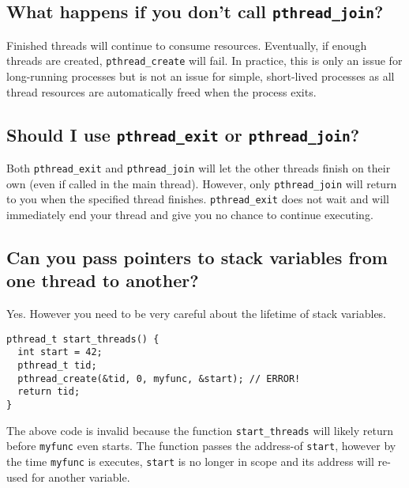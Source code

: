 \subsection{\texorpdfstring{What happens if you don't call
\texttt{pthread\_join}?}{What happens if you don't call pthread\_join?}}\label{what-happens-if-you-dont-call-pthreadux5fjoin}

Finished threads will continue to consume resources. Eventually, if
enough threads are created, \texttt{pthread\_create} will fail. In
practice, this is only an issue for long-running processes but is not an
issue for simple, short-lived processes as all thread resources are
automatically freed when the process exits.

\subsection{\texorpdfstring{Should I use \texttt{pthread\_exit} or
\texttt{pthread\_join}?}{Should I use pthread\_exit or pthread\_join?}}\label{should-i-use-pthreadux5fexit-or-pthreadux5fjoin}

Both \texttt{pthread\_exit} and \texttt{pthread\_join} will let the
other threads finish on their own (even if called in the main thread).
However, only \texttt{pthread\_join} will return to you when the
specified thread finishes. \texttt{pthread\_exit} does not wait and will
immediately end your thread and give you no chance to continue
executing.

\subsection{Can you pass pointers to stack variables from one thread to
another?}\label{can-you-pass-pointers-to-stack-variables-from-one-thread-to-another}

Yes. However you need to be very careful about the lifetime of stack
variables.

\begin{verbatim}
pthread_t start_threads() {
  int start = 42;
  pthread_t tid;
  pthread_create(&tid, 0, myfunc, &start); // ERROR!
  return tid;
}
\end{verbatim}

The above code is invalid because the function \texttt{start\_threads}
will likely return before \texttt{myfunc} even starts. The function
passes the address-of \texttt{start}, however by the time
\texttt{myfunc} is executes, \texttt{start} is no longer in scope and
its address will re-used for another variable.

